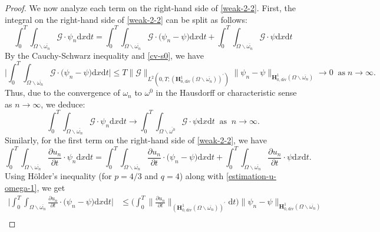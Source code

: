 \documentclass[a4paper,12pt,reqno,natbib]{amsart}
\newcommand{\dx} {\displaystyle\mathrm{d}x}
\newcommand{\dt} {\displaystyle\mathrm{d}t}
\def\H{\textbf{H}}
\begin{document}
\begin{proof}
\noindent We now analyze each term on the right-hand side of \eqref{weak-2-2}. First, the integral on the right-hand side of \eqref{weak-2-2} can be split as follows:
\begin{equation}\label{eq-21}
    \int_0^T\int_{\Omega\backslash\overline{\omega_n}} \mathcal{G}\cdot \psi_n \dx\dt=\int_0^T\int_{\Omega\backslash\overline{\omega_n}}\mathcal{G}\cdot\big(\psi_n-\psi\big)\dx\dt+\int_0^T\int_{\Omega\backslash\overline{\omega_n}} \mathcal{G}\cdot \psi \dx\dt
\end{equation}
By the Cauchy-Schwarz inequality and \eqref{cv-s0}, we have
\begin{equation}
  \big|\int_0^T\int_{\Omega\backslash\overline{\omega_n}} \mathcal{G}\cdot \big(\psi_n-\psi\big) \dx\dt\big|\leq T\big\|\mathcal{G} \big\|_{L^2(0,T;(\H^1_{0,\text{div}}(\Omega\backslash\overline{\omega_n}))^\prime)}\big\|\psi_n-\psi \big\|_{\H^1_{0,\text{div}}(\Omega\backslash\overline{\omega_n})}\longrightarrow0\;\;\text{as}\;n\to\infty.
\end{equation}
Thus, due to the convergence of $\omega_n$ to $\omega^0$ in the Hausdorff or characteristic sense as $n \to \infty$, we deduce:
\begin{equation}\label{eq-21-cv}
    \int_0^T\int_{\Omega\backslash\overline{\omega_n}} \mathcal{G}\cdot \psi_n \dx\dt\longrightarrow\int_0^T\int_{\Omega\backslash\overline{\omega^0}} \mathcal{G}\cdot \psi \dx\dt\;\;\text{as}\;\; n\longrightarrow\infty.
\end{equation}
Similarly, for the first term on the right-hand side of \eqref{weak-2-2}, we have
\begin{equation}\label{kj-1}
    \int_0^T\int_{\Omega\backslash\overline{\omega_n}}\frac{\partial u_n}{\partial t}\cdot \psi_n \dx\dt=\int_0^T\int_{\Omega\backslash\overline{\omega_n}}\frac{\partial u_n}{\partial t}\cdot \big(\psi_n -\psi\big)\dx\dt+\int_0^T\int_{\Omega\backslash\overline{\omega_n}}\frac{\partial u_n}{\partial t}\cdot \psi \dx\dt.
\end{equation}
Using H\"older's inequality (for $p=4/3$ and $q=4$) along with \eqref{estimation-u-omega-1}, we get
\begin{align*}
    \big|\int_0^T\int_{\Omega\backslash\overline{\omega_n}}\frac{\partial u_n}{\partial t}\cdot \big(\psi_n -\psi\big)\dx\dt\big|& \leq \big(\int_0^T\big\|\frac{\partial u_n}{\partial t} \big\|_{(\H^1_{0,\text{div}}(\Omega\backslash\overline{\omega_n}))^\prime}\dt\big)\big\|\psi_n-\psi \big\|_{\H^1_{0,\text{div}}(\Omega\backslash\overline{\omega_n})}\\

\end{align*}
\end{proof}
\end{document}
